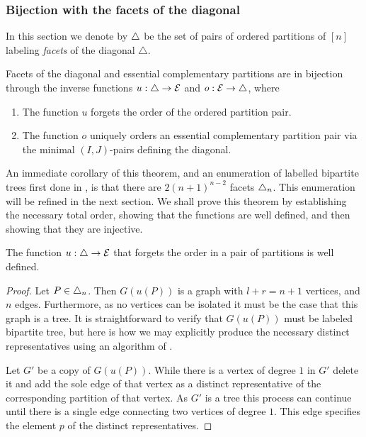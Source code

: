 \subsubsection{Bijection with the facets of the diagonal}

In this section we denote by $\triangle$ be the set of pairs of ordered partitions of $[n]$ labeling \emph{facets} of the diagonal $\triangle$. 

\begin{theorem}
\label{thm:facets}
Facets of the diagonal and essential complementary partitions are in bijection through the inverse functions $u:\triangle \to \mathcal{E}$ and $o:\mathcal{E}\to \triangle$, where
\begin{enumerate}
    \item The function $u$ forgets the order of the ordered partition pair.
    \item The function $o$ uniquely orders an essential complementary partition pair via the minimal $(I,J)$-pairs defining the diagonal. 
\end{enumerate}
\end{theorem}
An immediate corollary of this theorem, and an enumeration of labelled bipartite trees first done in \cite{kajitani1982number}, is that there are $2(n+1)^{n-2}$ facets $\triangle_n$.
 This enumeration will be refined in the next section.
We shall prove this theorem by establishing the necessary total order, showing that the functions are well defined, and then showing that they are injective.

\begin{lemma} 
\label{l:u-well-defined}
The function $u:\triangle \to \mathcal{E}$ that forgets the order in a pair of partitions is well defined.
\end{lemma}
\begin{proof}
Let $P \in \triangle_n$. Then $G(u(P))$ is a graph with $l+r=n+1$ vertices, and $n$ edges. Furthermore, as no vertices can be isolated it must be the case that this graph is a tree. 
It is straightforward to verify that $G(u(P))$ must be labeled bipartite tree, but here is how we may explicitly produce the necessary distinct representatives using an algorithm of \cite[Theorem 2]{kajitani1982number}.

Let $G'$ be a copy of $G(u(P))$. 
While there is a vertex of degree $1$ in $G'$ delete it and add the sole edge of that vertex as a distinct representative of the corresponding partition of that vertex. 
As $G'$ is a tree this process can continue until there is a single edge connecting two vertices of degree $1$. 
This edge specifies the element $p$ of the distinct representatives.
\end{proof}

